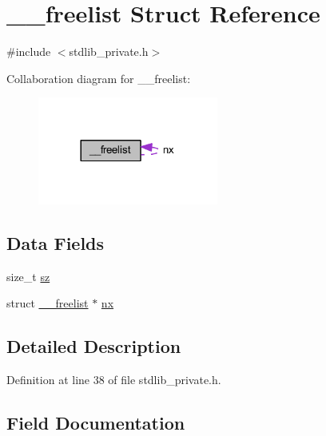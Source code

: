 \hypertarget{struct____freelist}{}\section{\+\_\+\+\_\+freelist Struct Reference}
\label{struct____freelist}


{\ttfamily \#include $<$stdlib\+\_\+private.\+h$>$}



Collaboration diagram for \+\_\+\+\_\+freelist\+:
\nopagebreak
\begin{figure}[H]
\begin{center}
\leavevmode
\includegraphics[width=168pt]{struct____freelist__coll__graph}
\end{center}
\end{figure}
\subsection*{Data Fields}
\begin{DoxyCompactItemize}
\item 
size\+\_\+t \hyperlink{struct____freelist_aad50db3bff52eed270f16ef9e6acd8b1}{sz}
\item 
struct \hyperlink{struct____freelist}{\+\_\+\+\_\+freelist} $\ast$ \hyperlink{struct____freelist_ae718f53598ce7902b5c21759e2d0a2ec}{nx}
\end{DoxyCompactItemize}


\subsection{Detailed Description}


Definition at line 38 of file stdlib\+\_\+private.\+h.



\subsection{Field Documentation}
\hypertarget{struct____freelist_ae718f53598ce7902b5c21759e2d0a2ec}{}
